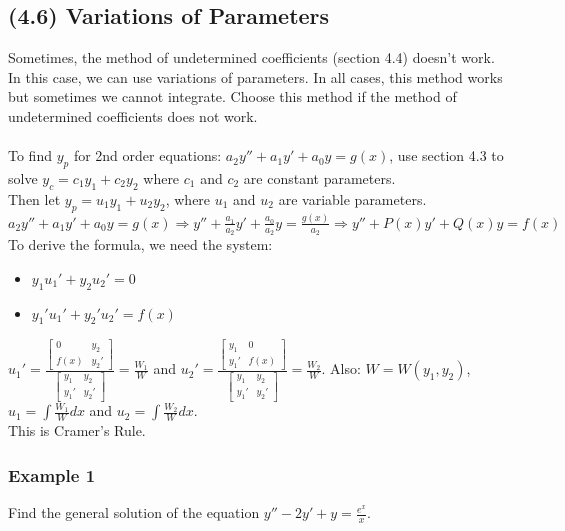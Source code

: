 \documentclass{article}
\newcommand{\mat}[4]{\begin{bmatrix} #1 & #2 \\ #3 & #4 \end{bmatrix}}
\begin{document}
\subsection{(4.6) Variations of Parameters}
Sometimes, the method of undetermined coefficients (section 4.4) doesn't work. In this case, we can use variations of parameters.
In all cases, this method works but sometimes we cannot integrate. Choose this method if the method of undetermined coefficients does not work.
\\\\To find $y_p$ for 2nd order equations: $a_2y''+a_1y'+a_0y=g(x)$, use section 4.3 to solve $y_c=c_1y_1+c_2y_2$ where $c_1$ and $c_2$ are constant parameters.
\\Then let $y_p=u_1y_1+u_2y_2$, where $u_1$ and $u_2$ are variable parameters.
\\$a_2y''+a_1y'+a_0y=g(x)\Rightarrow y''+\frac{a_1}{a_2}y'+\frac{a_0}{a_2}y=\frac{g(x)}{a_2}\Rightarrow y''+P(x)y'+Q(x)y=f(x)$
\\To derive the formula, we need the system: \begin{itemize}
    \itemsep 0em
    \item $y_1u_1'+y_2u_2'=0$
    \item $y_1'u_1'+y_2'u_2'=f(x)$
\end{itemize}
$u_1'=\frac{\mat{0}{y_2}{f(x)}{y_2'}}{\mat{y_1}{y_2}{y_1'}{y_2'}}=\frac{W_1}{W}$
and $u_2'=\frac{\mat{y_1}{0}{y_1'}{f(x)}}{\mat{y_1}{y_2}{y_1'}{y_2'}}=\frac{W_2}{W}$. Also: $W=W(y_1,y_2)$, $u_1=\int\frac{W_1}{W}dx$ and $u_2=\int\frac{W_2}{W}dx$.
\\This is Cramer's Rule.

\subsubsection{Example 1}
Find the general solution of the equation $y''-2y'+y=\frac{e^x}{x}$.
\end{document}
